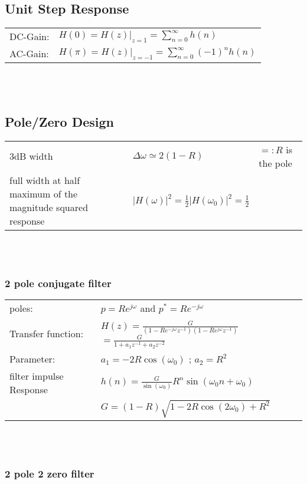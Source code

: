\subsection{Unit Step Response}
\begin{tabularx}{1\textwidth}{l X}
	DC-Gain: & $H(0) = H(z)|_{z=1}= \sum\limits_{n=0}^{\infty}h(n) $
	\\
	AC-Gain: & $H(\pi) = H(z)|_{z=-1}= \sum\limits_{n=0}^{\infty}(-1)^n h(n) $
\end{tabularx}\\ \\


\subsection{Pole/Zero Design}
\begin{tabularx}{1\textwidth}{Xll}
	3dB width & $\Delta\omega \simeq 2(1-R)$ & $=:R$ is the pole \\
	full width at half maximum of the magnitude squared response & $|H(\omega)|^2=\frac{1}{2}|H(\omega_0)|^2=\frac{1}{2}$&
\end{tabularx}\\ \\

\subsubsection{2 pole conjugate filter}

\begin{tabularx}{1\textwidth}{l X}
	poles: & $ p = R e^{j\omega}$ \qquad and \qquad $ p^* = R e^{-j\omega}$
	\\ 
	Transfer function: & $H(z)= \frac{G}{(1-R e^{-j\omega}z^{-1})(1-Re^{j\omega}z^{-1})}$\
	$=\frac{G}{1+a_1z^{-1}+a_2z^{-2}}$
	\\
	Parameter: & $a_1 = -2R\cos(\omega_0)$ \qquad; \qquad $a_2 = R^2$
	\\ 
	filter impulse Response & $h(n) = \frac{G}{\sin(\omega_0)}R^n \sin(\omega_0 n + \omega_0)$
	\\ 
	& $G = (1-R)\sqrt{1-2R\cos(2\omega_0)+ R^2}$
\end{tabularx}\\ \\

\subsubsection{2 pole 2 zero filter}


